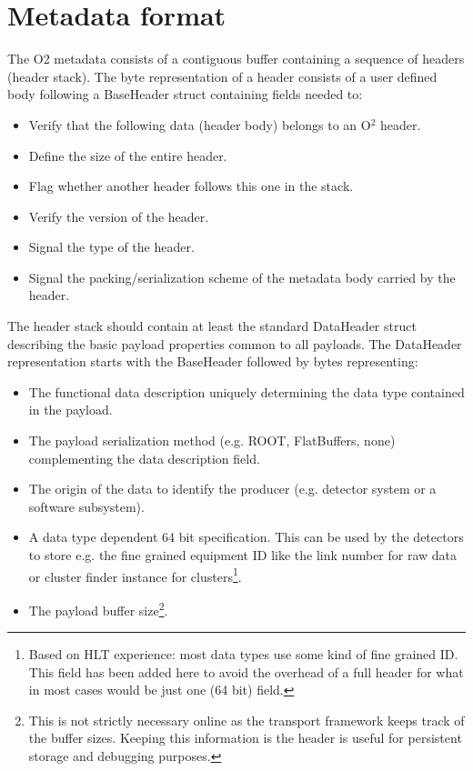 \documentclass[a4paper,twoside]{article}
\def\O2{O$^2$}
\begin{document}
\section{Metadata format}

The O2 metadata consists of a contiguous buffer containing a sequence of headers (header stack).
The byte representation of a header consists of a user defined body following a BaseHeader struct containing fields needed to:
\begin{itemize}
  \item Verify that the following data (header body) belongs to an \O2 header.
  \item Define the size of the entire header.
  \item Flag whether another header follows this one in the stack.
  \item Verify the version of the header.
  \item Signal the type of the header.
  \item Signal the packing/serialization scheme of the metadata body carried by the header.
\end{itemize}

The header stack should contain at least the standard DataHeader struct describing the basic payload properties common to all payloads. The DataHeader representation starts with the BaseHeader followed by bytes representing:
\begin{itemize}
  \item The functional data description uniquely determining the data type contained in the payload.
  \item The payload serialization method (e.g. ROOT, FlatBuffers, none) complementing the data description field.
  \item The origin of the data to identify the producer (e.g. detector system or a software subsystem).
  \item A data type dependent 64 bit specification. This can be used by the detectors to store e.g. the fine grained equipment ID like the link number for raw data or cluster finder instance for clusters\footnote{Based on HLT experience: most data types use some kind of fine grained ID. This field has been added here to avoid the overhead of a full header for what in most cases would be just one (64 bit) field.}.
  \item The payload buffer size\footnote{This is not strictly necessary online as the transport framework keeps track of the buffer sizes. Keeping this information is the header is useful for persistent storage and debugging purposes.}.
\end{itemize}
\end{document}
